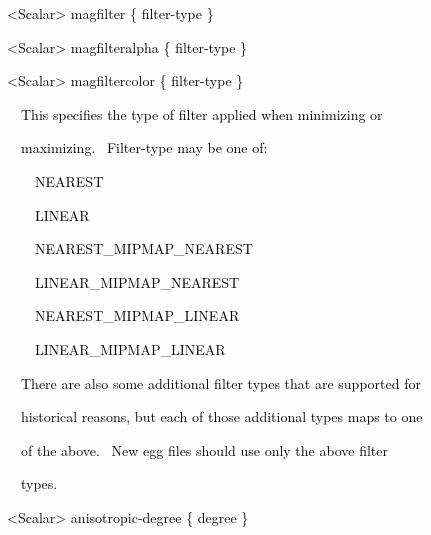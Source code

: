 \documentclass[a4paper]{article}
\newcommand\textstyleOOoComputerKeyWord[1]{\textrm{\textcolor[rgb]{0.0,0.0,0.5019608}{#1}}}
\begin{document}
{\color{black}
\textstyleOOoComputerKeyWord{\textcolor{black}{\ \ {\textless}Scalar{\textgreater} magfilter \{ filter-type \}}}}

{\color{black}
\textstyleOOoComputerKeyWord{\textcolor{black}{\ \ {\textless}Scalar{\textgreater} magfilteralpha \{ filter-type \}}}}

{\color{black}
\textstyleOOoComputerKeyWord{\textcolor{black}{\ \ {\textless}Scalar{\textgreater} magfiltercolor \{ filter-type \}}}}


\bigskip

{\color{black}
\textstyleOOoComputerKeyWord{\textcolor{black}{\ \ \ \ This specifies the type of filter applied when minimizing or}}}

{\color{black}
\textstyleOOoComputerKeyWord{\textcolor{black}{\ \ \ \ maximizing. \ Filter-type may be one of:}}}


\bigskip

{\color{black}
\textstyleOOoComputerKeyWord{\textcolor{black}{\ \ \ \ \ \ NEAREST}}}

{\color{black}
\textstyleOOoComputerKeyWord{\textcolor{black}{\ \ \ \ \ \ LINEAR}}}

{\color{black}
\textstyleOOoComputerKeyWord{\textcolor{black}{\ \ \ \ \ \ NEAREST\_MIPMAP\_NEAREST}}}

{\color{black}
\textstyleOOoComputerKeyWord{\textcolor{black}{\ \ \ \ \ \ LINEAR\_MIPMAP\_NEAREST}}}

{\color{black}
\textstyleOOoComputerKeyWord{\textcolor{black}{\ \ \ \ \ \ NEAREST\_MIPMAP\_LINEAR}}}

{\color{black}
\textstyleOOoComputerKeyWord{\textcolor{black}{\ \ \ \ \ \ LINEAR\_MIPMAP\_LINEAR}}}


\bigskip

{\color{black}
\textstyleOOoComputerKeyWord{\textcolor{black}{\ \ \ \ There are also some additional filter types that are supported
for}}}

{\color{black}
\textstyleOOoComputerKeyWord{\textcolor{black}{\ \ \ \ historical reasons, but each of those additional types maps to
one}}}

{\color{black}
\textstyleOOoComputerKeyWord{\textcolor{black}{\ \ \ \ of the above. \ New egg files should use only the above filter}}}

{\color{black}
\textstyleOOoComputerKeyWord{\textcolor{black}{\ \ \ \ types.}}}


\bigskip

{\color{black}
\textstyleOOoComputerKeyWord{\textcolor{black}{\ \ {\textless}Scalar{\textgreater} anisotropic-degree \{ degree \}}}}
\end{document}
